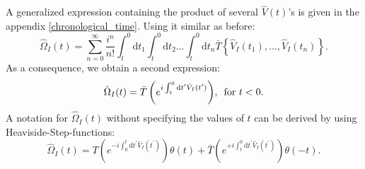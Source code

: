 \documentclass[
11pt, %
english, %
singlespacing, %
headsepline, %
]{MastersDoctoralThesis} %
\begin{document}
A generalized expression containing the product of several $ \hat{V}(t) $'s is given in the appendix \ref{chronological_time}.
Using it similar as before:
\begin{equation}
\hat{\Omega}_{I}(t) =
\sum\limits_{n=0}^{\infty} 
\frac{i^{n}}{n!}
\int^{0}_{t}\mathrm{d}t_1\int^{0}_{t}\! \! \mathrm{d}t_2
 \ldots
 \int^{0}_{t}\! \! \mathrm{d}t_n
 \bar{T}\left\lbrace \hat{V}_{I}(t_1), \ldots , \hat{V}_{I}(t_n)\right\rbrace .
\end{equation}
As a consequence, we obtain a second expression:\begin{equation}\label{eq:Omega_I_Chron1_0<}
\hat{\Omega}_{I}(t)
= \bar{T}\left( e^{i\int^{0}_{t}\mathrm{d}t^{\prime} \hat{V}_{I}(t^{\prime})} \right)
	\! ,\text{\enskip for  }  t<0 
	.
\end{equation}
A notation for $ \hat{\Omega}_{I}(t) $ without specifying the values of $ t $ can be derived by using Heaviside-Step-functions:
\begin{equation}\label{Omega_i_complete}
\hat{\Omega}_{I}(t)
=T\left( e^{-i\int_{0}^{t}\mathrm{d}t^{\prime} \hat{V}_{I}(t^{\prime})} \right)
\theta(t)
+
 \bar{T}\left( e^{+i\int_{t}^{0}\mathrm{d}t^{\prime} \hat{V}_{I}(t^{\prime})} \right)
 \theta(-t)
 .
\end{equation}
\end{document}
